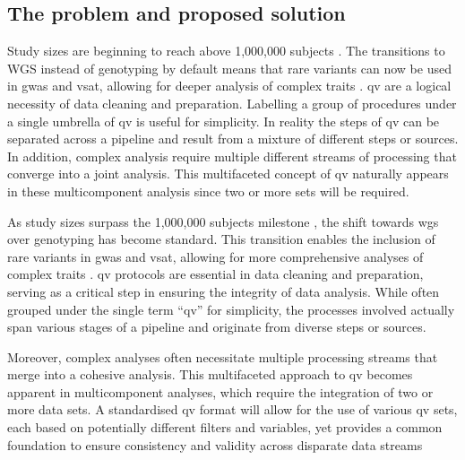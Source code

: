 \subsection{The problem and proposed solution}


Study sizes are beginning to reach above 1,000,000 subjects
\cite{lee2018gene, jansen2019genome}.
The transitions to WGS instead of genotyping by default means that rare variants can now be used in \ac{gwas} and \ac{vsat}, allowing for deeper analysis of complex traits
\cite{manolio2009finding, young2019solving}. %
\ac{qv} are a logical necessity of data cleaning and preparation. 
Labelling a group of procedures under a single umbrella of \ac{qv} is useful for simplicity. 
In reality the steps of \ac{qv} can be separated across a pipeline and result from a mixture of different steps or sources. 
In addition, complex analysis require multiple different streams of processing that converge into a joint analysis.
This multifaceted concept of \ac{qv} naturally appears in these multicomponent analysis since two or more sets will be required.

As study sizes surpass the 1,000,000 subjects milestone \cite{lee2018gene, jansen2019genome}, the shift towards \ac{wgs} over genotyping has become standard. 
This transition enables the inclusion of rare variants in \ac{gwas} and \ac{vsat}, allowing for more comprehensive analyses of complex traits \cite{manolio2009finding, young2019solving}. 
\ac{qv} protocols are essential in data cleaning and preparation, serving as a critical step in ensuring the integrity of data analysis. 
While often grouped under the single term ``\ac{qv}'' for simplicity, the processes involved actually span various stages of a pipeline and originate from diverse steps or sources.

Moreover, complex analyses often necessitate multiple processing streams that merge into a cohesive analysis. 
This multifaceted approach to \ac{qv} becomes apparent in multicomponent analyses, which require the integration of two or more data sets. 
A standardised \ac{qv} format will allow for the use of various \ac{qv} sets, each based on potentially different filters and variables, yet provides a common foundation to ensure consistency and validity across disparate data streams

